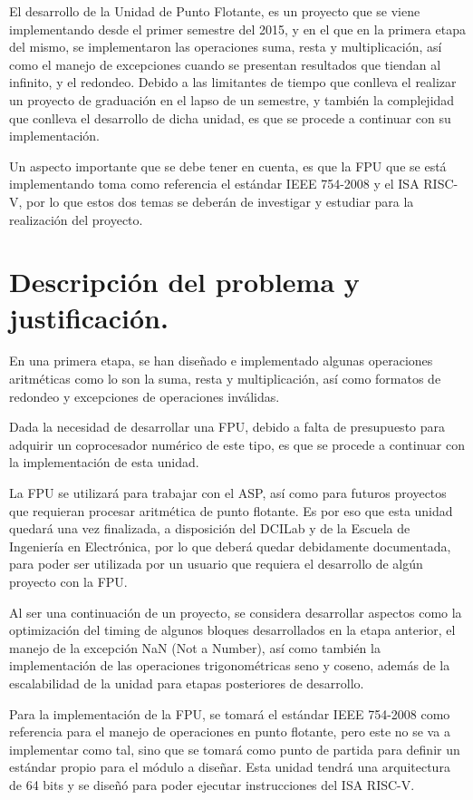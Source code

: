 El desarrollo de la Unidad de Punto Flotante, es un proyecto que se viene implementando desde el primer semestre del 2015, y en el que en la primera etapa del mismo, se implementaron las operaciones suma, resta y multiplicación, así como el manejo de excepciones cuando se presentan resultados que tiendan al infinito, y el redondeo. Debido a las limitantes de tiempo que conlleva el realizar un proyecto de graduación en el lapso de un semestre, y también la complejidad que conlleva el desarrollo de dicha unidad, es que se procede a continuar con su implementación.

Un aspecto importante que se debe tener en cuenta, es que la FPU que se está implementando toma como referencia el estándar IEEE 754-2008 \cite{IEEE_aritm} \cite{754_bfp} y el ISA RISC-V, por lo que estos dos temas se deberán de investigar y estudiar para la realización del proyecto.


\section{Descripción del problema y justificación.}

En una primera etapa, se han diseñado e implementado algunas operaciones aritméticas como lo son la suma, resta y multiplicación, así como formatos de redondeo y excepciones de operaciones inválidas.

Dada la necesidad de desarrollar una FPU, debido a falta de presupuesto para adquirir un coprocesador numérico de este tipo, es que se procede a continuar con la implementación de esta unidad.

La FPU se utilizará para trabajar con el ASP, así como para futuros proyectos que requieran procesar aritmética de punto flotante. Es por eso que esta unidad quedará una vez finalizada, a disposición del DCILab y de la Escuela de Ingeniería en Electrónica, por lo que deberá quedar debidamente documentada, para poder ser utilizada por un usuario que requiera el desarrollo de algún proyecto con la FPU.

Al ser una continuación de un proyecto, se considera desarrollar aspectos como la optimización del timing de algunos bloques desarrollados en la etapa anterior, el manejo de la excepción NaN (Not a Number), así como también la implementación de las operaciones trigonométricas seno y coseno, además de la escalabilidad de la unidad para etapas posteriores de desarrollo.

Para la implementación de la FPU, se tomará el estándar IEEE 754-2008 como referencia para el manejo de operaciones en punto flotante, pero este no se va a implementar como tal, sino que se tomará como punto de partida para definir un estándar propio para el módulo a diseñar.
Esta unidad tendrá una arquitectura de 64 bits y se diseñó para poder ejecutar instrucciones del ISA RISC-V.


